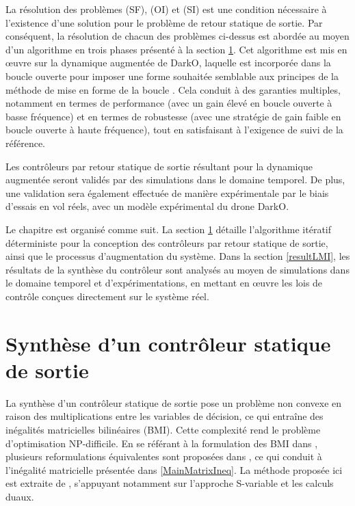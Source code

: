 La résolution des problèmes (SF), (OI) et (SI) est une condition nécessaire à l'existence d'une solution pour le problème de retour statique de sortie. Par conséquent, la résolution de chacun des problèmes ci-dessus est abordée au moyen d'un algorithme en trois phases présenté à la section \ref{SOF Controller Synthesis}. Cet algorithme est mis en œuvre sur la dynamique augmentée de DarkO, laquelle est incorporée dans la boucle ouverte pour imposer une forme souhaitée semblable aux principes de la méthode de mise en forme de la boucle \cite{McFarlane1992}. Cela conduit à des garanties multiples, notamment en termes de performance (avec un gain élevé en boucle ouverte à basse fréquence) et en termes de robustesse (avec une stratégie de gain faible en boucle ouverte à haute fréquence), tout en satisfaisant à l'exigence de suivi de la référence. 

Les contrôleurs par retour statique de sortie résultant pour la dynamique augmentée seront validés par des simulations dans le domaine temporel. De plus, une validation sera également effectuée de manière expérimentale par le biais d'essais en vol réels, avec un modèle expérimental du drone DarkO. 

Le chapitre est organisé comme suit. La section \ref{SOF Controller Synthesis} détaille l'algorithme itératif déterministe pour la conception des contrôleurs par retour statique de sortie, ainsi que le processus d'augmentation du système. Dans la section \ref{resultLMI}, les résultats de la synthèse du contrôleur sont analysés au moyen de simulations dans le domaine temporel et d'expérimentations, en mettant en œuvre les lois de contrôle conçues directement sur le système réel. 



\section{Synthèse d'un contrôleur statique de sortie}
\label{SOF Controller Synthesis}

La synthèse d'un contrôleur statique de sortie pose un problème non convexe en raison des multiplications entre les variables de décision, ce qui entraîne des inégalités matricielles bilinéaires (BMI). Cette complexité rend le problème d'optimisation NP-difficile. 
En se référant à la formulation des BMI dans \cite{ebihara2015}, plusieurs reformulations équivalentes sont proposées dans \cite{Arzelier2018}, ce qui conduit à l'inégalité matricielle présentée dans \eqref{MainMatrixIneq}. La méthode proposée ici est extraite de \cite{ebihara2015}, s'appuyant notamment sur l'approche S-variable et les calculs duaux.



